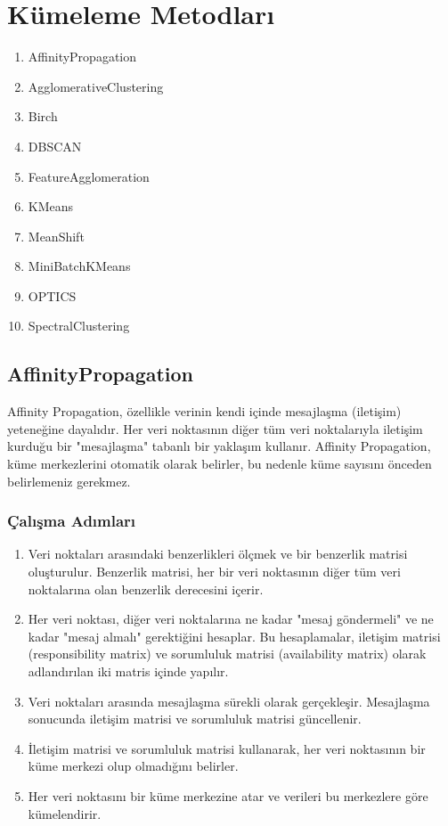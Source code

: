 \section{Kümeleme Metodları} 
\begin{enumerate}
    \item AffinityPropagation
    \item AgglomerativeClustering
    \item Birch
    \item DBSCAN
    \item FeatureAgglomeration
    \item KMeans
    \item MeanShift
    \item MiniBatchKMeans
    \item OPTICS
    \item SpectralClustering
\end{enumerate}

\newpage

\subsection{AffinityPropagation}
Affinity Propagation, özellikle verinin kendi içinde mesajlaşma (iletişim) yeteneğine dayalıdır. Her veri noktasının diğer tüm veri noktalarıyla iletişim kurduğu bir "mesajlaşma" tabanlı bir yaklaşım kullanır. Affinity Propagation, küme merkezlerini otomatik olarak belirler, bu nedenle küme sayısını önceden belirlemeniz gerekmez.

\subsubsection{Çalışma Adımları}
\begin{enumerate}
    \item Veri noktaları arasındaki benzerlikleri ölçmek ve bir benzerlik matrisi oluşturulur. Benzerlik matrisi, her bir veri noktasının diğer tüm veri noktalarına olan benzerlik derecesini içerir.
    \item Her veri noktası, diğer veri noktalarına ne kadar "mesaj göndermeli" ve ne kadar "mesaj almalı" gerektiğini hesaplar. Bu hesaplamalar, iletişim matrisi (responsibility matrix) ve sorumluluk matrisi (availability matrix) olarak adlandırılan iki matris içinde yapılır.
    \item Veri noktaları arasında mesajlaşma sürekli olarak gerçekleşir. Mesajlaşma sonucunda iletişim matrisi ve sorumluluk matrisi güncellenir.
    \item İletişim matrisi ve sorumluluk matrisi kullanarak, her veri noktasının bir küme merkezi olup olmadığını belirler.
    \item Her veri noktasını bir küme merkezine atar ve verileri bu merkezlere göre kümelendirir.
\end{enumerate}

